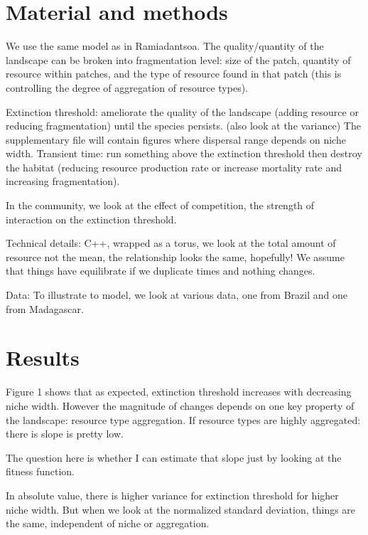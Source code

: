 \section{Material and methods}
\label{sec:Methods}
We use the same model as in Ramiadantsoa.
The quality/quantity of the landscape can be broken into fragmentation level: size of the patch, quantity of resource within patches, and the type of resource
found in that patch (this is controlling the degree of aggregation of resource types).


Extinction threshold: ameliorate the quality of the landscape (adding resource or reducing fragmentation) until the species persists. (also look at the variance)
The supplementary file will contain figures where dispersal range depends on niche width.
Transient time: run something above the extinction threshold then destroy the habitat (reducing resource production rate or increase mortality rate
and increasing fragmentation).

In the community, we look at the effect of competition, the strength of interaction on the extinction threshold.

Technical details: C++, wrapped as a torus, we look at the total amount of resource not the mean, the relationship looks the same, hopefully!
We assume that things have equilibrate if we duplicate times and nothing changes.

Data:
To illustrate to model, we look at various data, one from Brazil and one from Madagascar.


\section{Results}
\label{sec:Results}
Figure 1 shows that as expected, extinction threshold increases with decreasing niche width.
However the magnitude of changes depends on one key property of the landscape: resource type aggregation.
If resource types are highly aggregated: there is slope is pretty low.

The question here is whether I can estimate that slope just by looking at the fitness function.

In absolute value, there is higher variance for extinction threshold for higher niche width.
But when we look at the normalized standard deviation, things are the same, independent of niche or aggregation.
